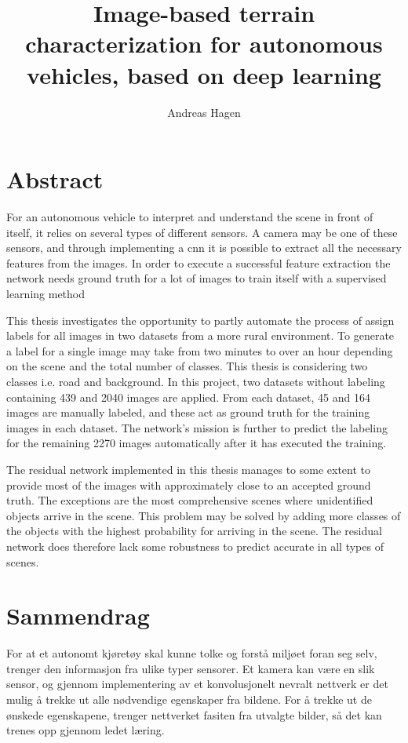 \documentclass[USenglish]{ifimaster}  %
\title{Image-based terrain characterization for autonomous vehicles, based on deep learning}        %
\author{Andreas Hagen}                      %
\begin{document}
\duoforside[dept={Department of Physics},   %
  program={Electronics and Computer Technology Program option: Cybernetics},  %
  short]                                        %

\frontmatter{}
\chapter*{Abstract}                   %
For an autonomous vehicle to interpret and understand the scene in front of itself, it relies on several types of different sensors. A camera may be one of these sensors, and through implementing a \acf{cnn} it is possible to extract all the necessary features from the images. In order to execute a successful feature extraction the network needs ground truth for a lot of images to train itself with a supervised learning method

This thesis investigates the opportunity to partly automate the process of assign labels for all images in two datasets from a more rural environment. To generate a label for a single image may take from two minutes to over an hour depending on the scene and the total number of classes. This thesis is considering two classes i.e. road and background. In this project, two datasets without labeling containing 439 and 2040 images are applied. From each dataset, 45 and 164 images are manually labeled, and these act as ground truth for the training images in each dataset. The network's mission is further to predict the labeling for the remaining 2270 images automatically after it has executed the training.

The residual network implemented in this thesis manages to some extent to provide most of the images with approximately close to an accepted ground truth. The exceptions are the most comprehensive scenes where unidentified objects arrive in the scene. This problem may be solved by adding more classes of the objects with the highest probability for arriving in the scene. The residual network does therefore lack some robustness to predict accurate in all types of scenes. 

\chapter*{Sammendrag}
For at et autonomt kjøretøy skal kunne tolke og forstå miljøet foran seg selv, trenger den informasjon fra ulike typer sensorer. Et kamera kan være en slik sensor, og gjennom implementering av et konvolusjonelt nevralt nettverk er det mulig å trekke ut alle nødvendige egenskaper fra bildene. For å trekke ut de ønskede egenskapene, trenger nettverket fasiten fra utvalgte bilder, så det kan trenes opp gjennom ledet læring.
\end{document}
